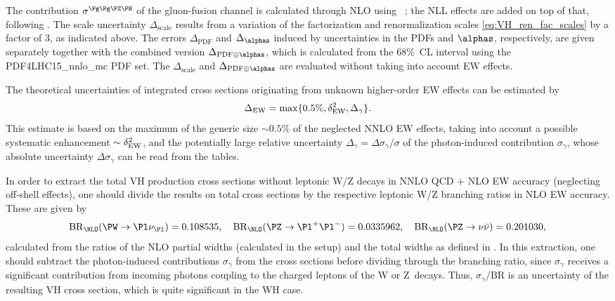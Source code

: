 The contribution $\sigma^{\Pg\Pg\PZ\PH}$ of the gluon-fusion channel is
calculated through NLO
using \VHNNLO~\cite{Brein:2012ne,Harlander:2013mla,Altenkamp:2012sx};
the NLL effects are added on top of that, following .
The scale uncertainty
$\Delta_{\mathrm{scale}}$ results from a variation of the factorization
and renormalization scales \eqref{eq:VH_ren_fac_scales} by a factor of
$3$, as indicated above. 
The errors $\Delta_{\mathrm{PDF}}$ and $\Delta_{\alphas}$ induced by
uncertainties in the PDFs and $\alphas$, respectively, are given separately
together with the combined version
$\Delta_{\mathrm{PDF\oplus\alphas}}$, which is calculated 
from the 68\%~CL interval using the PDF4LHC15\_nnlo\_mc PDF
set. The 
$\Delta_{\mathrm{scale}}$ and $\Delta_{\mathrm{PDF\oplus\alphas}}$ are
evaluated without taking into account EW effects.

The theoretical uncertainties of integrated cross sections originating from unknown higher-order 
EW effects can be estimated by
\begin{equation}
\Delta_{\mathrm{EW}} = \max\{0.5\%,\delta_{\mathrm{EW}}^2,\Delta_\gamma\}.
\label{eq:VH_EW_THU}
\end{equation}
This estimate is based on the maximum of the generic size $\sim0.5\%$ of the neglected
NNLO EW effects, taking into account a possible systematic enhancement $\sim\delta_{\mathrm{EW}}^2$,
and the potentially large relative uncertainty $\Delta_\gamma=\Delta\sigma_\gamma/\sigma$ of the photon-induced
contribution $\sigma_\gamma$, whose absolute uncertainty $\Delta\sigma_\gamma$
can be read from the tables.

In order to extract the total VH production cross sections without
leptonic W/Z decays in NNLO QCD + NLO EW accuracy (neglecting off-shell effects),
one should divide the results on total cross sections by the respective
leptonic W/Z branching ratios in NLO EW accuracy.
These are given by
\begin{equation}
\mathrm{BR}_{\NLO}(\PW\to\Pl\nu_{\Pl}) = 0.108535, \quad
\mathrm{BR}_{\NLO}(\PZ\to\Pl^+\Pl^-) = 0.0335962, \quad
\mathrm{BR}_{\NLO}(\PZ\to\nu\bar\nu) = 0.201030,
\end{equation}
calculated from the ratios of the NLO partial widths 
(calculated in the \HAWK{} setup) and the total widths 
as defined in . 
In this extraction, one should subtract the photon-induced contributions $\sigma_\gamma$ from the
cross sections before dividing through
the branching ratio, since $\sigma_\gamma$ receives a significant contribution
from incoming photons coupling to the charged leptons of the W or Z~decays.
Thus, $\sigma_\gamma/\mathrm{BR}$ is an uncertainty of the resulting VH cross section, which
is quite significant in the WH case.

